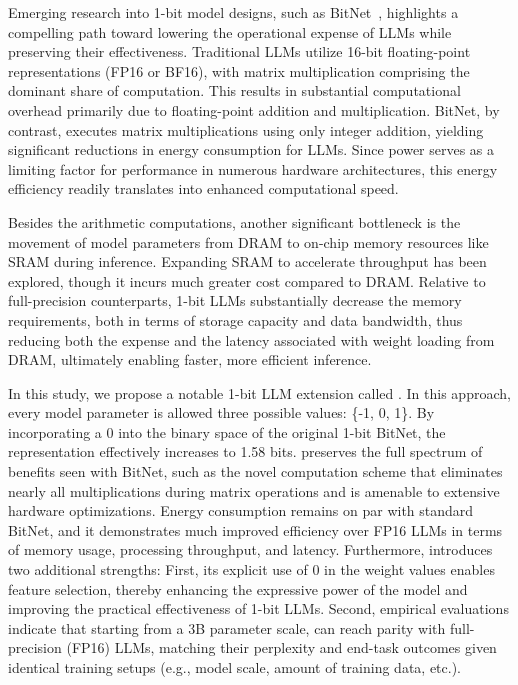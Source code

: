 Emerging research into 1-bit model designs, such as BitNet~\cite{bitnet}, highlights a compelling path toward lowering the operational expense of LLMs while preserving their effectiveness. Traditional LLMs utilize 16-bit floating-point representations (FP16 or BF16), with matrix multiplication comprising the dominant share of computation. This results in substantial computational overhead primarily due to floating-point addition and multiplication. BitNet, by contrast, executes matrix multiplications using only integer addition, yielding significant reductions in energy consumption for LLMs. Since power serves as a limiting factor for performance in numerous hardware architectures, this energy efficiency readily translates into enhanced computational speed.

Besides the arithmetic computations, another significant bottleneck is the movement of model parameters from DRAM to on-chip memory resources like SRAM during inference. Expanding SRAM to accelerate throughput has been explored, though it incurs much greater cost compared to DRAM. Relative to full-precision counterparts, 1-bit LLMs substantially decrease the memory requirements, both in terms of storage capacity and data bandwidth, thus reducing both the expense and the latency associated with weight loading from DRAM, ultimately enabling faster, more efficient inference.

In this study, we propose a notable 1-bit LLM extension called \textbf{}. In this approach, every model parameter is allowed three possible values: \{-1, 0, 1\}. By incorporating a 0 into the binary space of the original 1-bit BitNet, the representation effectively increases to 1.58 bits.  preserves the full spectrum of benefits seen with BitNet, such as the novel computation scheme that eliminates nearly all multiplications during matrix operations and is amenable to extensive hardware optimizations. Energy consumption remains on par with standard BitNet, and it demonstrates much improved efficiency over FP16 LLMs in terms of memory usage, processing throughput, and latency. Furthermore,  introduces two additional strengths: First, its explicit use of 0 in the weight values enables feature selection, thereby enhancing the expressive power of the model and improving the practical effectiveness of 1-bit LLMs. Second, empirical evaluations indicate that starting from a 3B parameter scale,  can reach parity with full-precision (FP16) LLMs, matching their perplexity and end-task outcomes given identical training setups (e.g., model scale, amount of training data, etc.).

